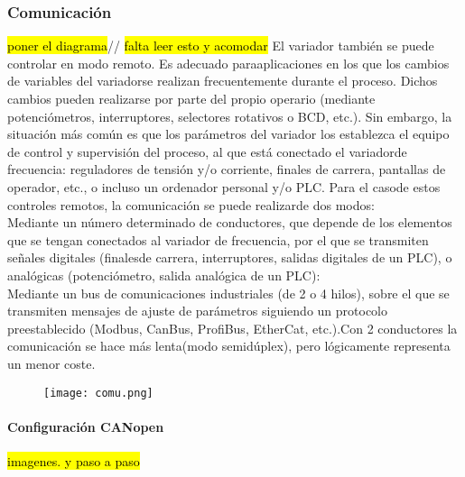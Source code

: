 \subsubsection{Comunicación}
\hl{poner el diagrama}//
\hl{falta leer esto y acomodar}
El   variador   también   se   puede   controlar   en   modo   remoto.   Es   adecuado   paraaplicaciones en   los   que   los   cambios   de   variables   del   variadorse   realizan frecuentemente  durante  el proceso.  Dichos  cambios  pueden  realizarse  por  parte  del propio  operario  (mediante  potenciómetros,  interruptores,  selectores  rotativos  o  BCD, etc.).  Sin  embargo,  la  situación  más  común  es  que  los  parámetros  del  variador  los establezca  el  equipo  de  control  y  supervisión  del  proceso,  al  que  está  conectado  el variadorde  frecuencia: reguladores  de  tensión  y/o  corriente,  finales  de  carrera, pantallas de operador, etc., o incluso un ordenador personal y/o PLC. Para  el  casode  estos  controles  remotos,  la  comunicación  se  puede  realizarde  dos modos:\\Mediante un  número  determinado  de  conductores,  que  depende  de  los elementos que se tengan conectados al variador de frecuencia, por el que se transmiten señales digitales (finalesde carrera, interruptores, salidas digitales de un PLC), o analógicas (potenciómetro, salida analógica de un PLC):\\Mediante un bus de comunicaciones industriales (de 2 o 4 hilos), sobre el que se transmiten   mensajes   de   ajuste   de   parámetros   siguiendo   un   protocolo preestablecido (Modbus, CanBus, ProfiBus, EtherCat, etc.).Con 2  conductores la  comunicación  se  hace  más  lenta(modo  semidúplex),  pero  lógicamente representa un menor coste.

\begin{figure}[htb]
	\centering
	\texttt{[image: comu.png]}
\end{figure}


\paragraph{Configuración CANopen}

\hl{imagenes. y paso a paso}\\
\\

